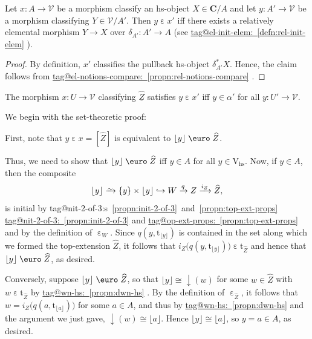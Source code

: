 \documentclass{amsart}
\makeatletter
\newcommand\bC{\mathbf{C}}
\newcommand\cV{\mathcal{V}}
\newcommand\dwnfn{{\downarrow}}
\newcommand\Ein{\mathrel{\text{\textup{\euro}}}}
\newcommand\ein{\mathrel{\varepsilon}}
\newcommand\floor[2][]{#1\lfloor #2 #1\rfloor}
\newcommand\hs{\mathrm{hs}}
\newcommand\hto{\hookrightarrow}
\newcommand\pbig[1]{\big({#1}\big)}
\newcommand\rt{\mathrm{t}}
\newcommand\rV{\mathrm{V}}
\newcommand\set[2][]{#1\{ #2 #1\}}
\newcommand\toi{\xrightarrow{\raisebox{-2.5pt}[0pt][0pt]{\ensuremath{\scriptstyle{\sim}}}}}
\newcommand\tox[2][]{\xrightarrow[#1]{#2}}
\newcommand\und[1]{\underline{#1}}
\newcommand\unein{{\ein}}
\newcommand\wh[1]{\widehat{#1}}
\newcommand\tagword[1]{\csname tag@#1\endcsname}
\def\label@tag#1:#2\@nil{#1}
\newcommand\labeltag[1]{\label@tag#1:\@nil}
\newcommand\jref[1]{%
  \texorpdfstring%
    {\hyperref[#1]{\tagword{\labeltag{#1}}~\ref*{#1}}}%
    {\tagword{\labeltag{#1}}~\ref*{#1}}%
}
\newcommand\jrefs[2]{%
  \ifthenelse{\equal{\labeltag{#1}}{\labeltag{#2}}}%
  {%
    \texorpdfstring%
      {\tagword{\labeltag{#1}}s~\ref{#1}~and~\ref{#2}}%
      {\tagword{\labeltag{#1}}s~\ref*{#1}~and~\ref*{#2}}%
  }{\jref{#1} and \jref{#2}}%
}
\theoremstyle{definition}
\theoremstyle{remark}
\theoremstyle{plainwithref}
\newenvironment{settybox}{\begin{tcolorbox}[colback=blue!20,breakable%
    ,enhanced%
    ,sharp corners%
    ,frame hidden%
    ,boxsep=0pt
    ,left=5pt,right=5pt,top=5pt,bottom=5pt
    ,enlarge left by=-5pt,width=\linewidth+10pt
    ,enlarge top by=5pt,enlarge bottom by=5pt
    ,before skip balanced=0pt,after skip balanced=0pt
    ]}{\end{tcolorbox}}
\makeatother
\begin{document}
\begin{claim} \label{claim:rel-elem-crit}
  Let \( x \colon A \to \cV \) be a morphism classify an hs-object \( X \in \bC / A \) and let \( y \colon A' \to \cV \) be a morphism classifying \( Y \in \cV / A' \).
  Then \( y \ein x' \) iff there exists a relatively elemental morphism \( Y \to X \) over \( \delta_{A'} \colon A' \to A \) (see \jref{defn:rel-init-elem}).
\end{claim}

\begin{proof}
  By definition, \( x' \) classifies the pullback hs-object \( \delta_{A'}^* X \).
  Hence, the claim follows from \jref{propn:rel-notions-compare}.
\end{proof}

\begin{claim}
  The morphism \( x \colon U \to \cV \) classifying \( \und{\wh Z} \) satisfies \( y \ein x' \) iff \( y \in \alpha' \) for all \( y \colon U' \to \cV \).
\end{claim}

We begin with the set-theoretic proof:
\begin{settybox}
  First, note that \( y \ein x = [\wh Z] \) is equivalent to \( \floor{y} \Ein \wh Z \).

  Thus, we need to show that \( \floor{y} \Ein \wh Z \) iff \( y \in A \) for all \( y \in \rV_\hs \).
  Now, if \( y \in A \), then the composite
  \[
    \floor{y}
    \toi \set{y} \times \floor{y}
    \hto W
    \tox{q} Z
    \tox{i_Z} \wh Z,
  \]
  is initial by \jrefs{propn:init-2-of-3}{propn:top-ext-props} and by the definition of \( \unein_W \).
  Since \( q(y, \rt_{\floor{y}}) \) is contained in the set along which we formed the top-extension \( \wh Z \), it follows that \( i_Z\pbig{q(y, \rt_{\floor y})} \ein \rt_{\wh Z} \) and hence that \( \floor{y} \Ein \wh Z \), as desired.

  Conversely, suppose \( \floor{y} \Ein \wh Z \), so that \( \floor{y} \cong \dwnfn(w) \) for some \( w \in \wh Z \) with \( w \ein \rt_{\wh Z} \) by \jref{propn:dwn-hs}.
  By the definition of \( \unein_{\wh Z} \), it follows that \( w = i_Z\pbig{q(a, \rt_{\floor a})} \) for some \( a \in A \), and thus by \jref{propn:dwn-hs} and the argument we just gave, \( \dwnfn(w) \cong \floor{a} \).
  Hence \( \floor{y} \cong \floor{a} \), so \( y = a \in A \), as desired.
\end{settybox}
\end{document}
